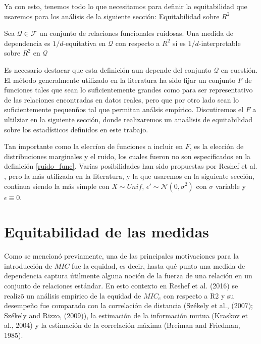 	Ya con esto, tenemos todo lo que necesitamos para definir la equitabilidad que usaremos para los an\'alisis de la siguiente secci\'on: Equitabilidad sobre $R^2$

	\begin{defn}
		Sea $\mathcal{Q}\in\mathcal{F}$ un conjunto de relaciones funcionales ruidosas. Una medida de dependencia es $1/d$-equitativa en $\mathcal{Q}$ con respecto a $R^2$ si es $1/d$-interpretable sobre $R^2$ en $\mathcal{Q}$ 
	\end{defn}

	Es necesario destacar que esta definici\'on aun depende del conjunto $\mathcal{Q}$ en cuesti\'on. El m\'etodo generalmente utilizado en la literatura ha sido fijar un conjunto $F$ de funciones tales que sean lo suficientemente grandes como para ser representativo de las relaciones encontradas en datos reales, pero que por otro lado sean lo suficientemente pequen\~nos tal que permitan an\'alsis emp\'irico. Discutiremos el $F$ a ultilziar en la siguiente secci\'on, donde realizaremos un ana\'alisis de equitabilidad sobre los estad\'isticos definidos en este trabajo.

	Tan importante como la elecc\'ion de funciones a incluir en $F$, es la elecci\'on de distribuciones marginales y el ruido, los cuales fueron no son especificados en la definici\'on \ref{ruido_func}. Varias posibilidades han sido propuestas por Reshef et al. \cite{Reshef2015a}, pero la m\'as utilizada en la literatura, y la que usaremos en la siguiente secci\'on, continua siendo la m\'as simple con $X\sim Unif$, $\epsilon\prime\sim\mathcal{N}(0,\sigma^2)$ con $\sigma$ variable y $\epsilon\equiv0$. 

	
	\section[equitabilidadmice]{Equitabilidad de las medidas}

	
	Como se mencion\'o previamente, una de las principales motivaciones para la introducci\'on de $MIC$ fue la equidad, es decir, hasta qu\'e punto una medida de dependencia captura \'utilmente alguna noci\'on de la fuerza de una relaci\'on en un conjunto de relaciones est\'andar. En esto contexto en Reshef et al. (2016) \cite{Reshef2016} se realiz\~o un an\'alisis emp\'irico de la equidad de $MIC_e$ con respecto a R2 y su desempe\~no fue comparado con la correlaci\'on de distancia (Sz\'ekely et al., (2007)\cite{Szekely2007}; Sz\'ekely and Rizzo, (2009)\cite{Szekely2009}), la estimaci\'on de la informaci\'on mutua (Kraskov et al., 2004) y la estimaci\'on de la correlaci\'on m\'axima (Breiman and Friedman, 1985).

